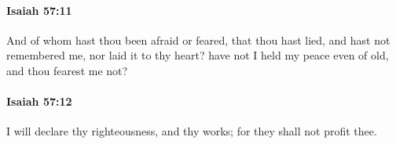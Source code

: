 		\paragraph{Isaiah 57:11} %
			\label{ISAIAH-57-11}

			And of whom hast thou been afraid or feared, that thou hast lied, and hast not remembered me, nor laid it to thy heart? have not I held my peace even of old, and thou fearest me not?


		\paragraph{Isaiah 57:12} %
			\label{ISAIAH-57-12}

			I will declare thy righteousness, and thy works; for they shall not profit thee.


